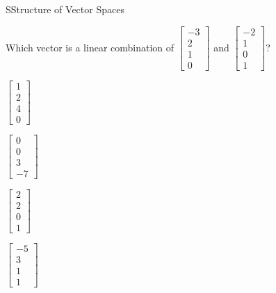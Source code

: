 \documentclass{article}[12pt]
\begin{document}
\begin{module}{S}{Structure of Vector Spaces}
\begin{readinessAssuranceTest}
  \item Which vector is a linear combination of \(
  \begin{bmatrix}
    -3 \\ 2 \\ 1 \\ 0
  \end{bmatrix}\) and \(
  \begin{bmatrix}
    -2 \\ 1 \\ 0 \\ 1
  \end{bmatrix}\)?
    \begin{multicols}{4}
    \begin{readinessAssuranceTestChoices}
      \item \(
      \begin{bmatrix}
        1 \\ 2 \\ 4 \\ 0
      \end{bmatrix}
      \)
      \item \(
      \begin{bmatrix}
        0 \\ 0 \\ 3 \\ -7
      \end{bmatrix}
      \)
  	\item \(
      \begin{bmatrix}
        2 \\ 2 \\ 0 \\ 1
      \end{bmatrix}
      \)
  	\item \(
      \begin{bmatrix}
        -5 \\ 3 \\ 1 \\ 1
      \end{bmatrix}
      \) %

    \end{readinessAssuranceTestChoices}
    \end{multicols}



\end{readinessAssuranceTest}
\end{module}
\end{document}
